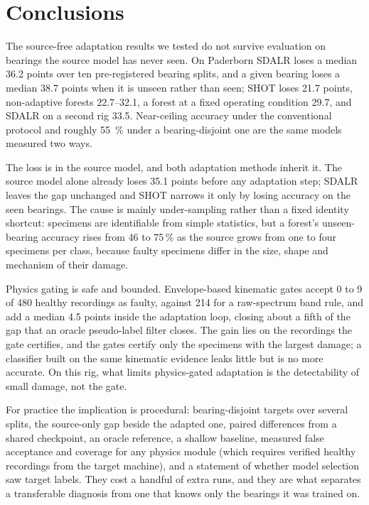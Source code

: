 \section{Conclusions}
\label{sec:conclusions}

The source-free adaptation results we tested do not survive evaluation on bearings the source model has never seen. On
Paderborn SDALR loses a median 36.2 points over ten pre-registered bearing splits, and a given bearing loses a median 38.7
points when it is unseen rather than seen; SHOT loses 21.7 points, non-adaptive forests 22.7--32.1, a forest at a fixed
operating condition 29.7, and SDALR on a second rig 33.5. Near-ceiling accuracy under the conventional protocol and roughly
\SI{55}{\percent} under a bearing-disjoint one are the same models measured two ways.

The loss is in the source model, and both adaptation methods inherit it. The source model alone already loses 35.1 points before any
adaptation step; SDALR leaves the gap unchanged and SHOT narrows it only by losing accuracy on the seen bearings. The cause is
mainly under-sampling rather than a fixed identity shortcut: specimens are identifiable from simple statistics, but
a forest's unseen-bearing accuracy rises from 46 to 75\,\% as the source grows from one to four specimens per class, because faulty
specimens differ in the size, shape and mechanism of their damage.

Physics gating is safe and bounded. Envelope-based kinematic gates accept 0 to 9 of 480 healthy recordings as faulty, against
214 for a raw-spectrum band rule, and add a median 4.5 points inside the adaptation loop, closing about a fifth of the gap that
an oracle pseudo-label filter closes. The gain lies on the recordings the gate certifies, and the gates certify only the
specimens with the largest damage; a classifier built on the same kinematic evidence leaks little but is no more accurate. On
this rig, what limits physics-gated adaptation is the detectability of small damage, not the gate.

For practice the implication is procedural: bearing-disjoint targets over several splits, the source-only gap beside the
adapted one, paired differences from a shared checkpoint, an oracle reference, a shallow baseline, measured false acceptance
and coverage for any physics module (which requires verified healthy recordings from the target machine), and a statement of whether model selection saw target labels. They cost a handful of
extra runs, and they are what separates a transferable diagnosis from one that knows only the bearings it was trained on.

